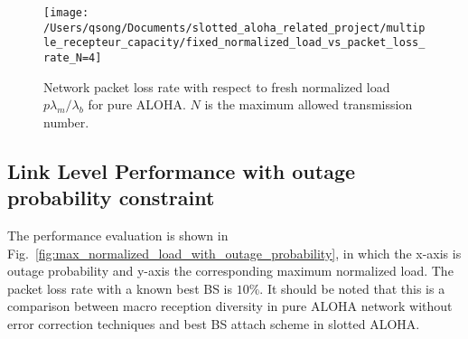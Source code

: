 \begin{figure}[!th]
	\centering
	\texttt{[image: /Users/qsong/Documents/slotted\_aloha\_related\_project/multiple\_recepteur\_capacity/fixed\_normalized\_load\_vs\_packet\_loss\_rate\_N=4]}
	\caption{Network packet loss rate with respect to fresh normalized load $p\lambda_{m}/\lambda_{b}$ for pure ALOHA. $N$ is the maximum allowed transmission number.}
	\label{fig:fixed_load_vs_packet_loss_rate_diversity}
\end{figure}





\subsection{Link Level Performance with outage probability constraint}
The performance evaluation is shown in Fig.~\ref{fig:max_normalized_load_with_outage_probability}, in which the x-axis is outage probability and y-axis the corresponding maximum normalized load. The packet loss rate with a known best BS is $10\%$. It should be noted that this is a comparison between macro reception diversity in pure ALOHA network without error correction techniques and best BS attach scheme in slotted ALOHA.

